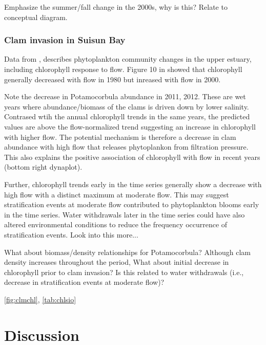 \documentclass[letterpaper,12pt,oneside]{article}\usepackage[]{graphicx}\usepackage[]{color}
\begin{document}
Emphasize the summer/fall change in the 2000s, why is this?  Relate to conceptual diagram.

\subsubsection{Clam invasion in Suisun Bay}
Data from \citep{Crauder16}, \citet{Jassby08} describes phytoplankton community changes in the upper estuary, including chlorophyll response to flow.  Figure 10 in \citet{Jassby08} showed that chlorophyll generally decreased with flow in 1980 but inreased with flow in 2000.

Note the decrease in Potamocorbula abundance in 2011, 2012.  These are wet years where abundance/biomass of the clams is driven down by lower salinity.  Contrased wtih the annual chlorophyll trends in the same years, the predicted values are above the flow-normalized trend suggesting an increase in chlorophyll with higher flow.  The potential mechanism is therefore a decrease in clam abundance with high flow that releases phytoplankon from filtration pressure.  This also explains the positive association of chlorophyll with flow in recent years (bottom right dynaplot). 

Further, chlorophyll trends early in the time series generally show a decrease with high flow with a distinct maximum at moderate flow.  This may suggest stratification events at moderate flow contributed to phytoplankton blooms early in the time series. Water withdrawals later in the time series could have also altered environmental conditions to reduce the frequency occurrence of stratification events.  Look into this more...

What about biomass/density relationships for Potamocorbula?  Although clam density increases throughout the period,  What about initial decrease in chlorophyll prior to clam invasion?  Is this related to water withdrawals (i.e., decrease in stratification events at moderate flow)?

\cref{fig:clmchl}, \cref{tab:chlsio}

\section{Discussion}

\clearpage
\begin{singlespace}


\end{singlespace}
\clearpage
\end{document}
